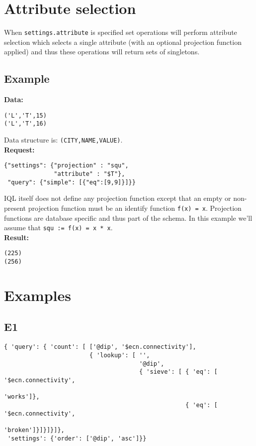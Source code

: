 \documentclass[12pt]{article}
\begin{document}
\section{Attribute selection}

When \verb|settings.attribute| is specified set operations will perform attribute selection which selects a single attribute (with an optional projection function applied) 
and thus these operations will return sets of singletons.

\subsection{Example}

\textbf{Data:}

\begin{verbatim}
('L','T',15)
('L','T',16)
\end{verbatim}

Data structure is: \verb|(CITY,NAME,VALUE)|. \\

\textbf{Request:}

\begin{verbatim}
{"settings": {"projection" : "squ",
              "attribute" : "$T"},
 "query": {"simple": [{"eq":[9,9]}]}}
\end{verbatim}

IQL itself does not define any projection function except that an empty or non-present projection function must be an identify function \verb|f(x) = x|.
Projection functions are database specific and thus part of the schema. In this example we'll assume that \verb|squ := f(x) = x * x|. \\

\textbf{Result:}

\begin{verbatim}
(225)
(256)
\end{verbatim}

\section{Examples}

\subsection{E1}

\tiny
\begin{verbatim}
{ 'query': { 'count': [ ['@dip', '$ecn.connectivity'],
                        { 'lookup': [ '',
                                      '@dip',
                                      { 'sieve': [ { 'eq': [ '$ecn.connectivity',
                                                             'works']},
                                                   { 'eq': [ '$ecn.connectivity',
                                                             'broken']}]}]}]},
 'settings': {'order': ['@dip', 'asc']}}
\end{verbatim}
\normalsize
\end{document}
